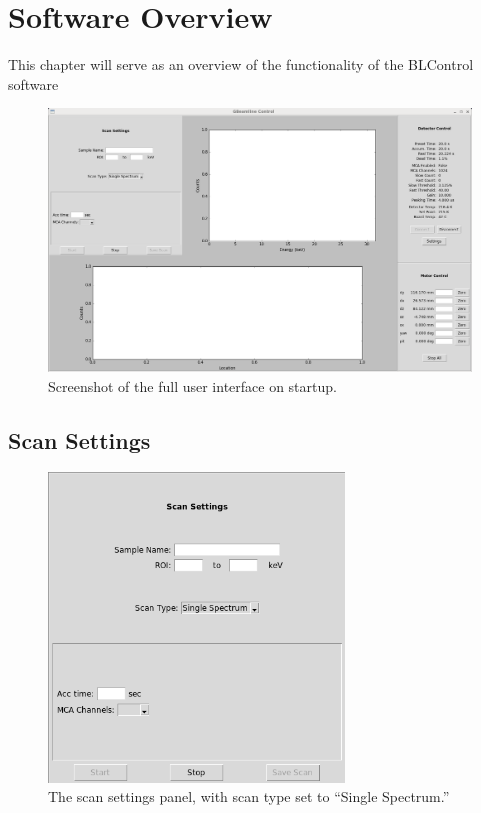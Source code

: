\chapter{Software Overview\label{sec:software}}

This chapter will serve as an overview of the functionality of the BLControl software

\begin{figure}
\centering
\includegraphics[width=\textwidth]{fullui.png}
\caption{\label{fig:ui} Screenshot of the full user interface on startup.}
\end{figure}

\section{Scan Settings}

\begin{figure}
\centering
\includegraphics[width=0.7\textwidth]{scansettings.png}
\caption{\label{fig:scanset} The scan settings panel, with scan type set to ``Single Spectrum.''}
\end{figure}

